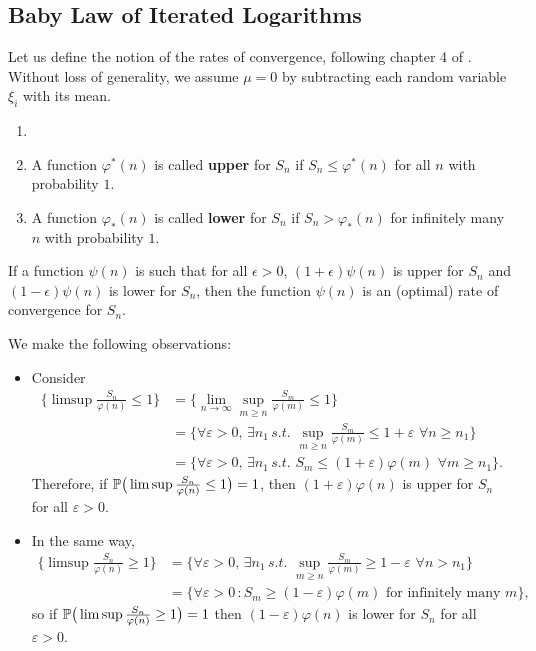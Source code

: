 \subsection{Baby Law of Iterated Logarithms}
Let us define the notion of the rates of convergence, following chapter 4 of \cite{Probability-2}. Without loss of generality, we assume $\mu = 0$ by subtracting each random variable $\xi_i$ with its mean.
\begin{definition}
\begin{enumerate}
    \item[]
    \item A function $\varphi^*(n)$ is called \textbf{upper} for $S_n$ if $S_n \le \varphi^*(n)$ for all $n$ with probability $1$.
    \item A function $\varphi_*(n)$ is called \textbf{lower} for $S_n$ if $S_n > \varphi_*(n)$ for infinitely many $n$ with probability $1$.
\end{enumerate}

If a function $\psi(n)$ is such that for all $\epsilon > 0$, $(1+\epsilon)\psi(n)$ is upper for $S_n$ and $(1-\epsilon)\psi(n)$ is lower for $S_n$, then the function $\psi(n)$ is an (optimal) rate of convergence for $S_n$.
\end{definition}

We make the following observations:
\begin{itemize}
\item Consider
\begin{align*}
    \bigg\{ \limsup \frac{S_n}{\varphi(n)} \le 1 \bigg\}
    &= \bigg\{ \lim_{n \to \infty} \sup_{m \ge n} \frac{S_m}{\varphi(m)} \le 1\bigg\}\\
    &= \bigg\{ \forall \varepsilon > 0, \, \exists n_1 \, s.t. \, \, \sup_{m \ge n} \frac{S_m}{\varphi(m)} \le 1 + \varepsilon \, \, \forall n \ge n_1 \bigg\}\\
    &= \bigg\{ \forall \varepsilon > 0, \, \exists n_1 \, s.t. \,\, S_m \le (1 + \varepsilon) \varphi(m) \, \, \forall m \ge n_1 \bigg\}.
\end{align*}
Therefore, if $\mathbb{P} \big(\limsup \frac{S_n}{\varphi(n)} \le 1\big) = 1$, then $(1 + \varepsilon) \varphi(n)$ is upper for $S_n$ for all $\varepsilon > 0$.
\item In the same way,
\begin{align*}
    \bigg \{ \limsup \frac{S_n}{\varphi(n)} \ge 1 \bigg\}
    &= \bigg\{ \forall \varepsilon > 0, \, \exists n_1 \, s.t. \, \, \sup_{m \ge n}\frac{S_m}{\varphi(m)} \ge 1 - \varepsilon \, \, \forall n > n_1 \bigg\}\\
    &= \bigg\{ \forall \varepsilon > 0 \, : S_m \ge (1 - \varepsilon) \varphi(m) \, \, \text{for infinitely many }m \bigg\},
\end{align*}
so if $\mathbb{P}\big( \limsup \frac{S_n}{\varphi(n)} \ge 1 \big) = 1$ then $(1 - \varepsilon)\varphi(n)$ is lower for $S_n$ for all $\varepsilon > 0$.
\end{itemize}

